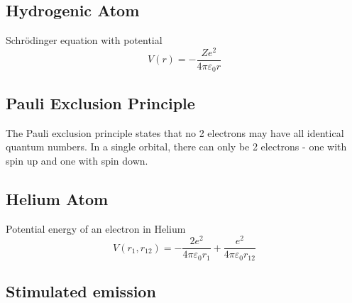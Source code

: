 \subsection{Hydrogenic Atom}
Schrödinger equation with potential
\begin{equation}
    V(r) = -\frac{Z e^2}{4 \pi \varepsilon_0 r}
\end{equation}

\subsection{Pauli Exclusion Principle}
The Pauli exclusion principle states that no 2 electrons may have all identical quantum numbers. 
In a single orbital, there can only be 2 electrons - one with spin up and one with spin down.

\subsection{Helium Atom}
Potential energy of an electron in Helium
\begin{equation}
    V(r_1,r_{12}) = -\frac{2e^2}{4 \pi \varepsilon_0 r_1} + \frac{e^2}{4 \pi \varepsilon_0 r_{12}}
\end{equation}

\subsection{Stimulated emission}

